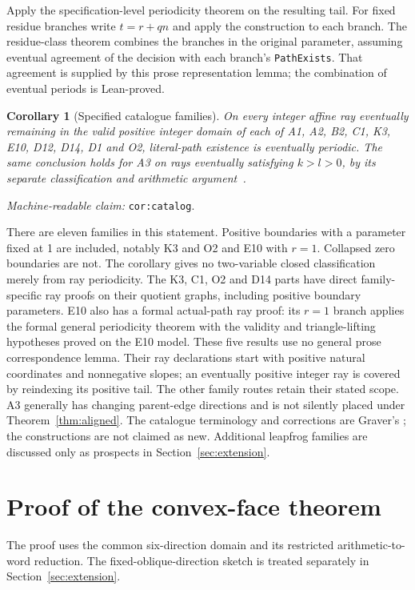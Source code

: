 \documentclass[11pt]{amsart}
\newcommand{\record}[1]{\nolinkurl{#1}}
\newcommand{\claimid}[1]{\par\nopagebreak\noindent\textit{Machine-readable claim:} \record{#1}.\par}
\newtheorem{catalogcor}{Corollary}
\theoremstyle{definition}\newtheorem{definition}{Definition}
\begin{document}
Apply the specification-level periodicity theorem on the resulting tail. For fixed
residue branches write $t=r+qn$ and apply the construction to each
branch. The residue-class theorem combines the branches in the
original parameter, assuming eventual
agreement of the decision with each branch's \record{PathExists}.
That agreement is supplied by this prose representation lemma;
the combination of eventual periods is Lean-proved.
\begin{catalogcor}[Specified catalogue families]\label{cor:catalog}
On every integer affine ray eventually remaining in the valid positive
integer domain of each of A1, A2, B2, C1, K3, E10, D12, D14, D1 and O2,
literal-path existence is eventually periodic. The same conclusion
holds for A3 on rays eventually satisfying $k>l>0$, by its separate
classification and arithmetic argument~\cite{A3}.
\end{catalogcor}
\claimid{cor:catalog}
There are eleven families in this statement. Positive boundaries with
a parameter fixed at 1 are included, notably K3 and O2 and E10 with
$r=1$. Collapsed zero boundaries are not. The corollary gives no
two-variable closed classification merely from ray periodicity.
The K3, C1, O2 and D14 parts have direct family-specific ray proofs on
their quotient graphs, including positive boundary parameters. E10 also
has a formal actual-path ray proof: its $r=1$ branch applies the formal
general periodicity theorem with the validity and triangle-lifting
hypotheses proved on the E10 model. These five results use no general
prose correspondence lemma. Their ray declarations start with
positive natural coordinates and nonnegative slopes; an eventually positive
integer ray is covered by reindexing its positive tail. The other family
routes retain their stated scope.
A3 generally has changing parent-edge directions and is not silently
placed under Theorem~\ref{thm:aligned}. The catalogue terminology and
corrections are Graver's \cite{Graver}; the constructions are not claimed
as new. Additional leapfrog families are discussed only as prospects
in Section~\ref{sec:extension}.

\section{Proof of the convex-face theorem}\label{sec:proof}
The proof uses the common six-direction domain and its restricted
arithmetic-to-word reduction. The fixed-oblique-direction sketch is
treated separately in Section~\ref{sec:extension}.
\end{document}
